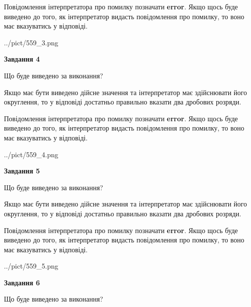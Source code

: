 \documentclass[12pt, ukrainian]{article}
\begin{document}
{\begin {Large}
Повідомлення інтерпретатора про помилку позначати \textbf{error}.
Якщо щось буде виведено до того, як інтерпретатор видасть повідомлення про помилку, 
то воно має вказуватись у відповіді. \par

\begin{center}
	{../pict/559_3.png}
\end{center}
\newpage

{\begin {center}\textbf{Завдання 4}\end {center}}\par
Що буде виведено за виконання? \par

Якщо має бути виведено дійсне значення та інтерпретатор має здійснювати його округлення, 
то у відповіді достатньо правильно вказати два дробових розряди.

Повідомлення інтерпретатора про помилку позначати \textbf{error}.
Якщо щось буде виведено до того, як інтерпретатор видасть повідомлення про помилку, 
то воно має вказуватись у відповіді. \par

\begin{center}
	{../pict/559_4.png}
\end{center}
\newpage

{\begin {center}\textbf{Завдання 5}\end {center}}\par
Що буде виведено за виконання? \par

Якщо має бути виведено дійсне значення та інтерпретатор має здійснювати його округлення, 
то у відповіді достатньо правильно вказати два дробових розряди.

Повідомлення інтерпретатора про помилку позначати \textbf{error}.
Якщо щось буде виведено до того, як інтерпретатор видасть повідомлення про помилку, 
то воно має вказуватись у відповіді. \par

\begin{center}
	{../pict/559_5.png}
\end{center}
\newpage

{\begin {center}\textbf{Завдання 6}\end {center}}\par
Що буде виведено за виконання? \par


\end{Large}}
\end{document}
